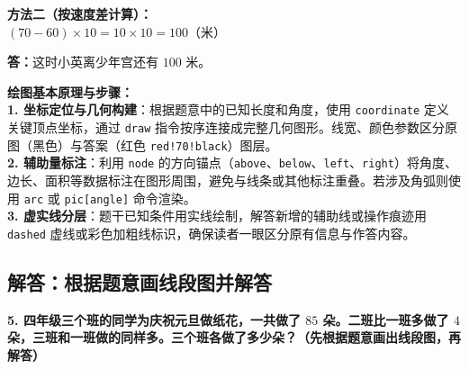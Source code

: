 \noindent
\textbf{方法二（按速度差计算）：}\\
$(70 - 60) \times 10 = 10 \times 10 = 100$（米）

\vspace{0.4cm}

\noindent
\textbf{答：}这时小英离少年宫还有 $100$ 米。

\vspace{0.8cm}


\vspace{0.6cm}

{\small\color{blue!70!black}
\textbf{绘图基本原理与步骤：}\\
\textbf{1. 坐标定位与几何构建}：根据题意中的已知长度和角度，使用 \texttt{coordinate} 定义关键顶点坐标，通过 \texttt{draw} 指令按序连接成完整几何图形。线宽、颜色参数区分原图（黑色）与答案（红色 \texttt{red!70!black}）图层。\\
\textbf{2. 辅助量标注}：利用 \texttt{node} 的方向锚点（\texttt{above}、\texttt{below}、\texttt{left}、\texttt{right}）将角度、边长、面积等数据标注在图形周围，避免与线条或其他标注重叠。若涉及角弧则使用 \texttt{arc} 或 \texttt{pic[angle]} 命令渲染。\\
\textbf{3. 虚实线分层}：题干已知条件用实线绘制，解答新增的辅助线或操作痕迹用 \texttt{dashed} 虚线或彩色加粗线标识，确保读者一眼区分原有信息与作答内容。
}

\newpage

\newpage

\subsection{解答：根据题意画线段图并解答}

\vspace{0.4cm}

\noindent\textbf{5. 四年级三个班的同学为庆祝元旦做纸花，一共做了 $85$ 朵。二班比一班多做了 $4$ 朵，三班和一班做的同样多。三个班各做了多少朵？（先根据题意画出线段图，再解答）}

\vspace{0.8cm}

